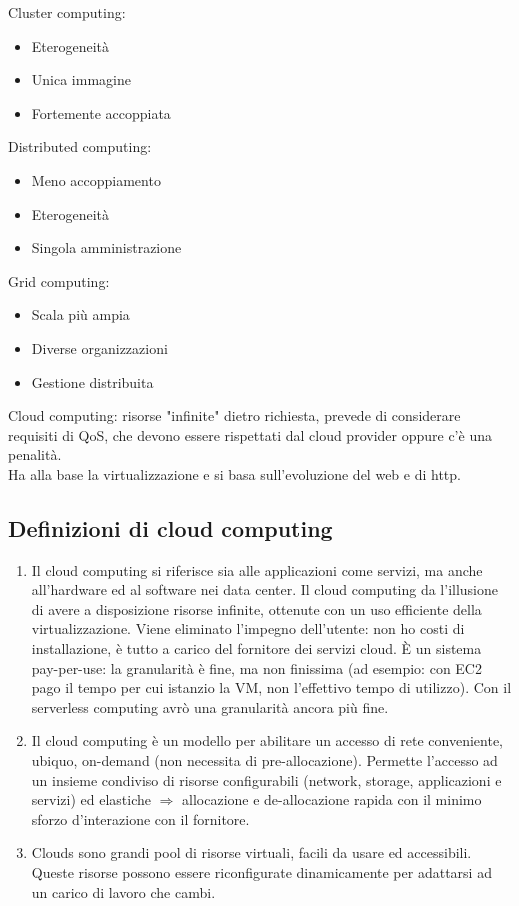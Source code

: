 \documentclass{article}
\begin{document}
Cluster computing:
\begin{itemize}
\item Eterogeneità
\item Unica immagine
\item Fortemente accoppiata
\end{itemize} 
Distributed computing:
\begin{itemize}
\item Meno accoppiamento
\item Eterogeneità
\item Singola amministrazione
\end{itemize}
Grid computing:
\begin{itemize}
\item Scala più ampia
\item Diverse organizzazioni
\item Gestione distribuita
\end{itemize}
Cloud computing: risorse "infinite" dietro richiesta, prevede di considerare requisiti di QoS, che devono essere rispettati dal cloud provider oppure c'è una penalità.\\ Ha alla base la virtualizzazione e si basa sull'evoluzione del web e di http.
\subsection{Definizioni di cloud computing}
\begin{enumerate}
\item Il cloud computing si riferisce sia alle applicazioni come servizi, ma anche all'hardware ed al software nei data center. Il cloud computing da l'illusione di avere a disposizione risorse infinite, ottenute con un uso efficiente della virtualizzazione. Viene eliminato l'impegno dell'utente: non ho costi di installazione, è tutto a carico del fornitore dei servizi cloud. È un sistema pay-per-use: la granularità è fine, ma non finissima (ad esempio: con EC2 pago il tempo per cui istanzio la VM, non l'effettivo tempo di utilizzo). Con il serverless computing avrò una granularità ancora più fine.
\item Il cloud computing è un modello per abilitare un accesso di rete conveniente, ubiquo, on-demand (non necessita di pre-allocazione). Permette l'accesso ad un insieme condiviso di risorse configurabili (network, storage, applicazioni e servizi) ed elastiche $\Rightarrow$ allocazione e de-allocazione rapida con il minimo sforzo d'interazione con il fornitore.
\item Clouds sono grandi pool di risorse virtuali, facili da usare ed accessibili. Queste risorse possono essere riconfigurate dinamicamente per adattarsi ad un carico di lavoro che cambi.
\end{enumerate}
\end{document}
